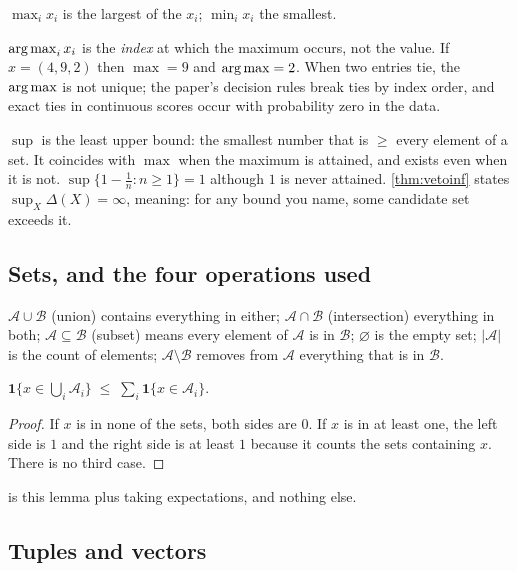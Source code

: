 $\max_i x_i$ is the largest of the $x_i$; $\min_i x_i$ the smallest.

\begin{definition}[argmax]
$\operatorname*{arg\,max}_{i} x_i$ is the \emph{index} at which the maximum occurs, not the value.
If $x=(4,9,2)$ then $\max = 9$ and $\operatorname*{arg\,max} = 2$. When two entries tie, the
$\operatorname*{arg\,max}$ is not unique; the paper's decision rules break ties by index order, and
exact ties in continuous scores occur with probability zero in the data.
\end{definition}

\begin{definition}[Supremum]
$\sup$ is the least upper bound: the smallest number that is $\ge$ every element
of a set. It coincides with $\max$ when the maximum is attained, and exists even
when it is not. $\sup\{1-\tfrac1n : n\ge1\}=1$ although $1$ is never attained.
\cref{thm:vetoinf} states $\sup_X \Delta(X)=\infty$, meaning: for any bound you
name, some candidate set exceeds it.
\end{definition}

\subsection{Sets, and the four operations used}

$\mathcal{A}\cup\mathcal{B}$ (union) contains everything in either;
$\mathcal{A}\cap\mathcal{B}$ (intersection) everything in both;
$\mathcal{A}\subseteq\mathcal{B}$ (subset) means every element of $\mathcal{A}$
is in $\mathcal{B}$; $\varnothing$ is the empty set; $|\mathcal{A}|$ is the count
of elements; $\mathcal{A}\setminus\mathcal{B}$ removes from $\mathcal{A}$
everything that is in $\mathcal{B}$.

\begin{lemma}
\label{lem:union}
$\mathbf{1}\{x\in\bigcup_i \mathcal{A}_i\}\;\le\;\sum_i \mathbf{1}\{x\in\mathcal{A}_i\}$.
\end{lemma}
\begin{proof}
If $x$ is in none of the sets, both sides are $0$. If $x$ is in at least one, the
left side is $1$ and the right side is at least $1$ because it counts the sets
containing $x$. There is no third case.
\end{proof}
 is this lemma plus taking expectations, and nothing else.

\subsection{Tuples and vectors}

